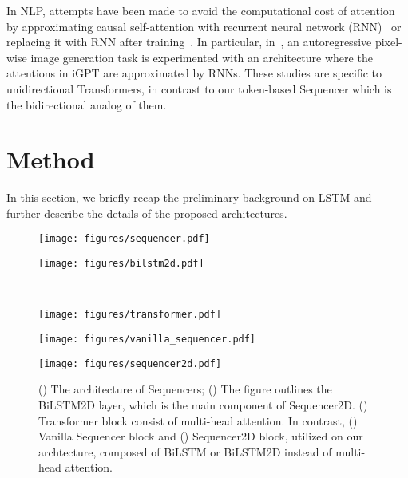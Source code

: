 \documentclass{article}
\begin{document}
In NLP, attempts have been made to avoid the computational cost of attention by approximating causal self-attention with recurrent neural network (RNN)~\cite{katharopoulos2020transformers} or replacing it with RNN after training~\cite{kasai2021finetuning}. In particular, in~\cite{katharopoulos2020transformers}, an autoregressive pixel-wise image generation task is experimented with an architecture where the attentions in iGPT are approximated by RNNs. These studies are specific to unidirectional Transformers, in contrast to our token-based Sequencer which is the bidirectional analog of them.

\section{Method}
\label{sec:method}
In this section, we briefly recap the preliminary background on LSTM and further describe the details of the proposed architectures.

\begin{figure}[tb]
  \centering
  \begin{minipage}[b]{0.38\hsize}
    \centering
    \texttt{[image: figures/sequencer.pdf]}
    \label{figure:sequencer}
  \end{minipage}
  \begin{minipage}[b]{0.38\hsize}
    \centering
    \texttt{[image: figures/bilstm2d.pdf]}
    \label{figure:bilstm2d}
  \end{minipage}
  \\
  \begin{minipage}[b]{0.15\hsize}
    \centering
    \texttt{[image: figures/transformer.pdf]}
    \label{figure:transformer}
  \end{minipage}
  \hspace{0.04\columnwidth}
  \begin{minipage}[b]{0.15\hsize}
    \centering
    \texttt{[image: figures/vanilla\_sequencer.pdf]}
    \label{figure:vanila_sequencer}
  \end{minipage}
  \hspace{0.04\columnwidth}
  \begin{minipage}[b]{0.15\hsize}
    \centering
    \texttt{[image: figures/sequencer2d.pdf]}
    \label{figure:sequencer2d}
  \end{minipage}
  \caption{() The architecture of Sequencers; () The figure outlines the BiLSTM2D layer, which is the main component of Sequencer2D. () Transformer block consist of multi-head attention. In contrast, () Vanilla Sequencer block and () Sequencer2D block, utilized on our archtecture, composed of BiLSTM or BiLSTM2D instead of multi-head attention.}
    \label{figure:overall}
\end{figure}
\end{document}
